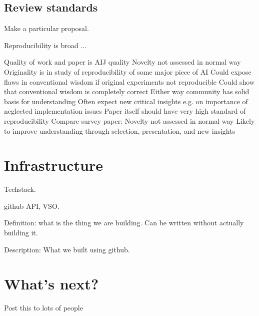 \documentclass[a4paper,11pt]{article}
\begin{document}
\subsection{ Review standards }

Make a particular proposal. 

Reproducibility is broad ... 


Quality of work and paper is AIJ quality
Novelty not assessed in normal way
Originality is in study of reproducibility of some major piece of AI
Could expose flaws in conventional wisdom if original experiments not reproducible
Could show that conventional wisdom is completely correct 
Either way community has solid basis for understanding 
Often expect new critical insights e.g. on importance of neglected implementation issues
Paper itself should have very high standard of reproducibility
Compare survey paper:
Novelty not assessed in normal way
Likely to improve understanding through selection, presentation, and new insights



\section{Infrastructure}

Techstack. 

github API, VSO. 


Definition: what is the thing we are building. Can be written without actually building it. 

Description: What we built using github. 


\section{What's next?}

Post this to lots of people




\end{document}
